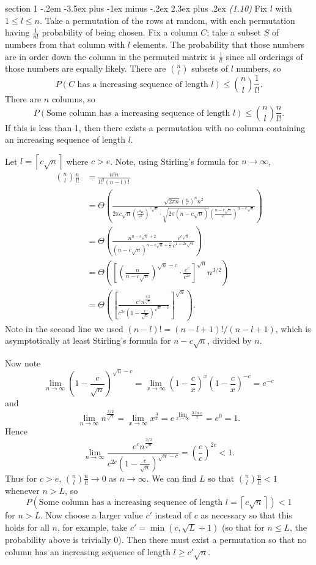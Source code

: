 \documentclass[12pt]{article}
\makeatletter
\theoremstyle{norm}
\newcommand{\rc}[1]{\frac{1}{#1}}
\newcommand{\ba}[1]{\left[ {#1} \right]}
\newcommand{\pa}[1]{\left( {#1} \right)}
\newcommand{\ce}[1]{\left\lceil {#1}\right\rceil}
\newcommand{\pf}[2]{\pa{\frac{#1}{#2}}}
\newenvironment{problem}{\@startsection
       {section}
       {1}
       {-.2em}
       {-3.5ex plus -1ex minus -.2ex}
       {2.3ex plus .2ex}
       {\pagebreak[3]%
       \large\bf\noindent{Problem }
       }
       }
       {%
       }
\makeatother
\begin{document}
\begin{problem} {\it (1.10)}
Fix $l$ with $1\leq l\leq n$. Take a permutation of the rows at random, with each permutation having $\frac{1}{n!}$ probability of being chosen. Fix a column $C$; take a subset $S$ of numbers from that column with $l$ elements. The probability that those numbers are in order down the column in the permuted matrix is $\frac{1}{l!}$ since all orderings of those numbers are equally likely. There are $\binom{n}{l}$ subsets of $l$ numbers, so
\[P(C\text{ has a increasing sequence of length }l)\leq \binom{n}{l}\frac{1}{l!}.\]
There are $n$ columns, so
\[P(\text{Some column has a increasing sequence of length }l)\leq \binom{n}{l}\frac{n}{l!}.\]
If this is less than 1, then there exists a permutation with no column containing an increasing sequence of length $l$.

Let $l=\ce{c\sqrt n}$ where $c>e$. Note, using Stirling's formula for $n\to \infty$, 
\begin{align*}
\binom{n}{l}\frac{n}{l!}&=\frac{n!n}{l!^2 (n-l)!}\\
&=\Theta\pa{ \frac{\sqrt{2\pi n}\pf ne^n n^2}{2\pi c\sqrt n\pf{c^2n}{e^2}^{c\sqrt n}\cdot \sqrt{2\pi (n-c\sqrt n)}\pf{n-c\sqrt n}e^{n-c\sqrt n}}}\\
&=\Theta \pa{\frac{n^{n-c\sqrt{n}+2}}{(n-c\sqrt n)^{n-c\sqrt n+\rc 2}} \frac{e^{c\sqrt n}}{c^{1+2c\sqrt n}}}\\
&=\Theta\pa{\ba{\pf{n}{n-c\sqrt n}^{\sqrt n-c}\cdot \frac{e^c}{c^{2c}}}^{\sqrt n} n^{3/2}}\\
&=\Theta\pa{\ba{\frac{e^cn^{\frac{3/2}{\sqrt n}}}{c^{2c}\pa{1-\frac{c}{\sqrt{n}}}^{\sqrt n-c}}}^{\sqrt n}}.
\end{align*}
Note in the second line we used $(n-l)!=(n-l+1)!/(n-l+1)$, which is asymptotically at least Stirling's formula for $n-c\sqrt n$, divided by $n$.

Now note \[\lim_{n\to \infty}\pa{1-\frac{c}{\sqrt{n}}}^{\sqrt n-c}=\lim_{x\to \infty}\pa{1-\frac{c}{x}}^{x}\pa{1-\frac{c}{x}}^{-c}=e^{-c}\]  and \[\lim_{n\to \infty}n^{\frac{3/2}{\sqrt n}}=\lim_{x\to \infty} x^{\frac 3x}=e^{\lim_{x\to\infty} \frac{3\ln x}{x}}=e^0=1.\]
Hence
\[
\lim_{n\to \infty}\frac{e^cn^{\frac{3/2}{\sqrt n}}}{c^{2c}\pa{1-\frac{c}{\sqrt{n}}}^{\sqrt n-c}}
=\pf ec^{2c}<1.
\]
Thus for $c>e$, $\binom{n}{l}\frac{n}{l!}\to 0$ as $n\to \infty$. We can find $L$ so that $\binom{n}{l}\frac{n}{l!}<1$ whenever $n>L$, so
\begin{equation}\label{p1-10-1}
P(\text{Some column has a increasing sequence of length }l=\ce{c\sqrt n})<1
\end{equation}
for $n>L$. 
Now choose a larger value $c'$ instead of $c$ as necessary so that
this holds for all $n$, for example, take $c'=\min(c,\sqrt{L}+1)$ (so that for $n\leq L$, the probability above is trivially 0). Then there must exist a permutation so that no column has an increasing sequence of length $l\geq c'\sqrt{n}$.

\end{problem}
\end{document}
